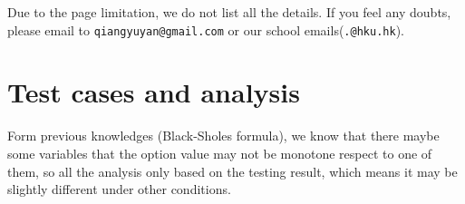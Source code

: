 \documentclass[11pt,a4paper]{article}
\begin{document}
    Due to the page limitation, we do not list all the details.
    If you feel any doubts, please email to
    \texttt{qiangyuyan@gmail.com} or 
    our school emails(\texttt{.@hku.hk}).
    


    \section{Test cases and analysis} 

    Form previous knowledges (Black-Sholes formula), 
    we know that 
    there maybe some variables that
    the option value may not be monotone
    respect to one of them, 
    so all the analysis only based on the testing
    result, which means it may be slightly different
    under other conditions.
    
\end{document}

